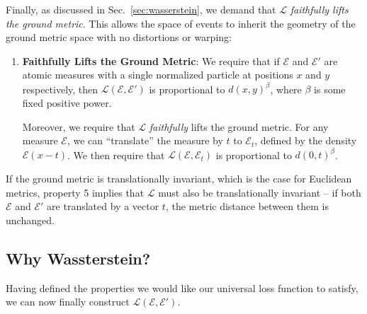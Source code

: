 \documentclass[letterpaper,11pt]{article}
\newcommand{\E}{\mathcal{E}}
\DeclareRobustCommand{\Sec}[1]{Sec.~\ref{sec:#1}}
\begin{document}
Finally, as discussed in \Sec{wasserstein}, we demand that $\mathcal{L}$ \emph{faithfully lifts the ground metric}.
%
This allows the space of events to inherit the geometry of the ground metric space with no distortions or warping:
%
\begin{enumerate}
    \setcounter{enumi}{\theenumTemp}
    \item \textbf{Faithfully Lifts the Ground Metric}: We require that if $\E$ and $\E'$ are atomic measures with a single normalized particle at positions $x$ and $y$ respectively, then $\mathcal{L}(\E,\E')$ is proportional to $d(x,y)^\beta$, where $\beta$ is some fixed positive power.
    
    Moreover, we require that $\mathcal{L}$ \emph{faithfully} lifts the ground metric. For any measure $\E$, we can ``translate'' the measure by $t$ to $\E_t$, defined by the density $\E(x-t)$. We then require that $\mathcal{L}(\E, \E_t)$ is proportional to $d(0,t)^\beta$. 
\end{enumerate}
%

If the ground metric is translationally invariant, which is the case for Euclidean metrics, property 5 implies that $\mathcal{L}$ must also be translationally invariant -- if both $\E$ and $\E'$ are translated by a vector $t$, the metric distance between them is unchanged.


\subsection{Why Wassterstein?}\label{app:wasserstein_appendix}

Having defined the properties we would like our universal loss function to satisfy, we can now finally construct $\mathcal{L}(\E,\E')$. 
\end{document}
